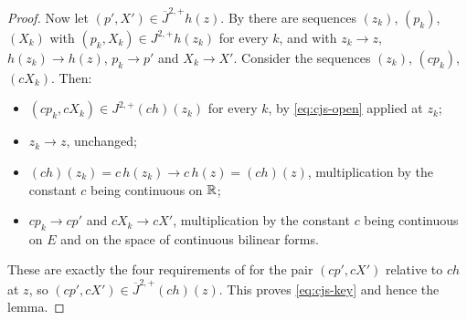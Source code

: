 \begin{proof}
Now let $(p',X')\in\overline J^{2,+}h(z)$. By  there are
sequences $(z_k)$, $(p_k)$, $(X_k)$ with
$(p_k,X_k)\in J^{2,+}h(z_k)$ for every $k$, and with $z_k\to z$,
$h(z_k)\to h(z)$, $p_k\to p'$ and $X_k\to X'$. Consider the sequences $(z_k)$,
$(cp_k)$, $(cX_k)$. Then:
\begin{itemize}
  \item $(cp_k,cX_k)\in J^{2,+}(ch)(z_k)$ for every $k$, by
    \eqref{eq:cjs-open} applied at $z_k$;
  \item $z_k\to z$, unchanged;
  \item $(ch)(z_k)=c\,h(z_k)\to c\,h(z)=(ch)(z)$, multiplication by the constant
    $c$ being continuous on $\mathbb{R}$;
  \item $cp_k\to cp'$ and $cX_k\to cX'$, multiplication by the constant $c$
    being continuous on $E$ and on the space of continuous bilinear forms.
\end{itemize}
These are exactly the four requirements of  for the pair
$(cp',cX')$ relative to $ch$ at $z$, so
$(cp',cX')\in\overline J^{2,+}(ch)(z)$. This proves \eqref{eq:cjs-key} and hence
the lemma.
\end{proof}
